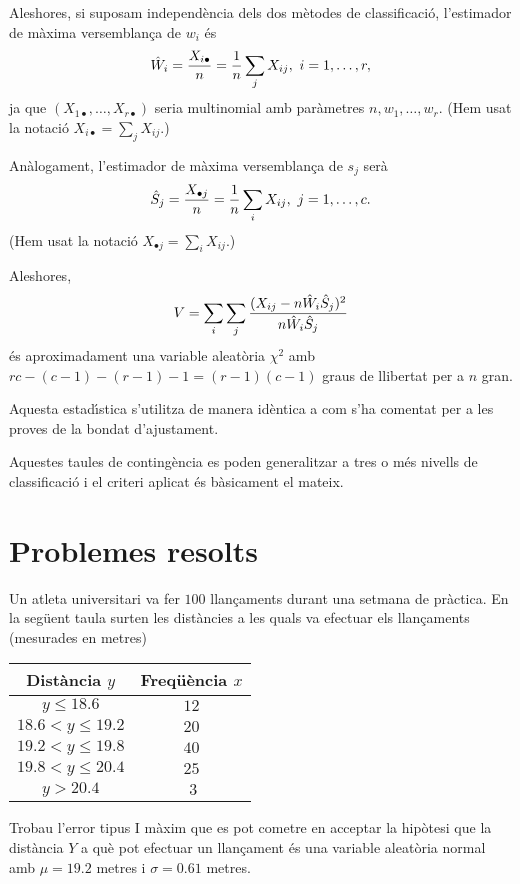Aleshores, si suposam independ\`encia dels dos m\`etodes de classificaci\'o,
 l'estimador
de m\`axima versemblan\c ca de $w_i$ \'es
$$\hat{W}_i = {X_{i\bullet} \over n} = {1 \over n} \sum_j X_{ij}, \ i = 1, \ldots ,
r,$$
ja que $(X_{1\bullet}, \ldots , X_{r\bullet})$ seria multinomial 
amb par\`ametres $n, w_1,
\ldots , w_r$. (Hem usat la notaci\'o $\displaystyle X_{i\bullet} = \sum_j X_{ij}$.)

An\`alogament, l'estimador de m\`axima versemblan\c{c}a de $s_j$ ser\`a
$$\hat{S}_j = {X_{\bullet j} \over n} = {1 \over n} \sum_i X_{ij}, \ j = 1, \ldots , c.$$
(Hem usat la notaci\'o $\displaystyle X_{\bullet j} = \sum_i X_{ij}$.)

Aleshores,
$$V = \sum_i \sum_j {(X_{ij} - n \hat{W}_i \hat{S}_j)^2 \over n \hat{W}_i
\hat{S}_j}$$
\'es aproximadament una variable aleat\`oria $\chi^2$ amb 
$r c-(c-1)-(r-1)-1=(r-1)(c-1)$ graus de
llibertat per a $n$ gran.

Aquesta estad\'{\i}stica s'utilitza de manera id\`entica a com s'ha comentat per a les
proves de la bondat d'ajustament.

Aquestes taules de conting\`encia 
es poden generalitzar a tres o m\'es nivells de
classificaci\'o
i el criteri 
aplicat \'es b\`asicament el mateix.

\section{Problemes resolts}

\begin{probres}
{Un atleta universitari va fer $100$ llan\c{c}aments durant una setmana de
pr\`actica. En la seg\"uent taula surten les dist\`ancies a les quals va efectuar els
llan\c{c}aments (mesurades en metres)
\begin{center}
\begin{tabular}{|c|c|}
\hline
Dist\`ancia $y$& Freq\"u\`encia $x$ \\
\hline\hline
$y\leq 18.6$&$12$ \\
\hline
$18.6< y\leq
19.2$& $20$\\ \hline
$19.2< y\leq 19.8$&$40$
\\\hline
$19.8< y\leq 20.4$&$25$\\\hline
$y>20.4$&$\ 3$\\\hline
\end{tabular}
\end{center}

Trobau l'error tipus I m\`axim que es pot cometre en acceptar 
la hip\`otesi que
la dist\`ancia $Y$ a qu\`e pot efectuar un llan\c{c}ament 
\'es una variable aleat\`oria normal amb $\mu
= 19.2$ metres i $\sigma = 0.61$ metres.}
\end{probres}

